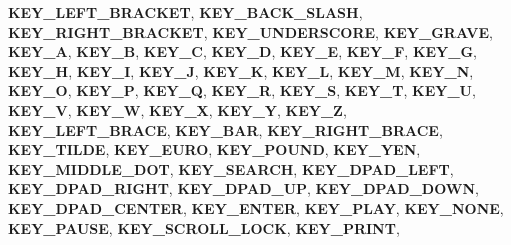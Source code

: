 \begin{DoxyCompactItemize}
{\bfseries K\+E\+Y\+\_\+\+L\+E\+F\+T\+\_\+\+B\+R\+A\+C\+K\+ET}, 
\newline
{\bfseries K\+E\+Y\+\_\+\+B\+A\+C\+K\+\_\+\+S\+L\+A\+SH}, 
{\bfseries K\+E\+Y\+\_\+\+R\+I\+G\+H\+T\+\_\+\+B\+R\+A\+C\+K\+ET}, 
{\bfseries K\+E\+Y\+\_\+\+U\+N\+D\+E\+R\+S\+C\+O\+RE}, 
{\bfseries K\+E\+Y\+\_\+\+G\+R\+A\+VE}, 
\newline
{\bfseries K\+E\+Y\+\_\+A}, 
{\bfseries K\+E\+Y\+\_\+B}, 
{\bfseries K\+E\+Y\+\_\+C}, 
{\bfseries K\+E\+Y\+\_\+D}, 
\newline
{\bfseries K\+E\+Y\+\_\+E}, 
{\bfseries K\+E\+Y\+\_\+F}, 
{\bfseries K\+E\+Y\+\_\+G}, 
{\bfseries K\+E\+Y\+\_\+H}, 
\newline
{\bfseries K\+E\+Y\+\_\+I}, 
{\bfseries K\+E\+Y\+\_\+J}, 
{\bfseries K\+E\+Y\+\_\+K}, 
{\bfseries K\+E\+Y\+\_\+L}, 
\newline
{\bfseries K\+E\+Y\+\_\+M}, 
{\bfseries K\+E\+Y\+\_\+N}, 
{\bfseries K\+E\+Y\+\_\+O}, 
{\bfseries K\+E\+Y\+\_\+P}, 
\newline
{\bfseries K\+E\+Y\+\_\+Q}, 
{\bfseries K\+E\+Y\+\_\+R}, 
{\bfseries K\+E\+Y\+\_\+S}, 
{\bfseries K\+E\+Y\+\_\+T}, 
\newline
{\bfseries K\+E\+Y\+\_\+U}, 
{\bfseries K\+E\+Y\+\_\+V}, 
{\bfseries K\+E\+Y\+\_\+W}, 
{\bfseries K\+E\+Y\+\_\+X}, 
\newline
{\bfseries K\+E\+Y\+\_\+Y}, 
{\bfseries K\+E\+Y\+\_\+Z}, 
{\bfseries K\+E\+Y\+\_\+\+L\+E\+F\+T\+\_\+\+B\+R\+A\+CE}, 
{\bfseries K\+E\+Y\+\_\+\+B\+AR}, 
\newline
{\bfseries K\+E\+Y\+\_\+\+R\+I\+G\+H\+T\+\_\+\+B\+R\+A\+CE}, 
{\bfseries K\+E\+Y\+\_\+\+T\+I\+L\+DE}, 
{\bfseries K\+E\+Y\+\_\+\+E\+U\+RO}, 
{\bfseries K\+E\+Y\+\_\+\+P\+O\+U\+ND}, 
\newline
{\bfseries K\+E\+Y\+\_\+\+Y\+EN}, 
{\bfseries K\+E\+Y\+\_\+\+M\+I\+D\+D\+L\+E\+\_\+\+D\+OT}, 
{\bfseries K\+E\+Y\+\_\+\+S\+E\+A\+R\+CH}, 
{\bfseries K\+E\+Y\+\_\+\+D\+P\+A\+D\+\_\+\+L\+E\+FT}, 
\newline
{\bfseries K\+E\+Y\+\_\+\+D\+P\+A\+D\+\_\+\+R\+I\+G\+HT}, 
{\bfseries K\+E\+Y\+\_\+\+D\+P\+A\+D\+\_\+\+UP}, 
{\bfseries K\+E\+Y\+\_\+\+D\+P\+A\+D\+\_\+\+D\+O\+WN}, 
{\bfseries K\+E\+Y\+\_\+\+D\+P\+A\+D\+\_\+\+C\+E\+N\+T\+ER}, 
\newline
{\bfseries K\+E\+Y\+\_\+\+E\+N\+T\+ER}, 
{\bfseries K\+E\+Y\+\_\+\+P\+L\+AY}, 
{\bfseries K\+E\+Y\+\_\+\+N\+O\+NE}, 
{\bfseries K\+E\+Y\+\_\+\+P\+A\+U\+SE}, 
\newline
{\bfseries K\+E\+Y\+\_\+\+S\+C\+R\+O\+L\+L\+\_\+\+L\+O\+CK}, 
{\bfseries K\+E\+Y\+\_\+\+P\+R\+I\+NT}, 

\end{DoxyCompactItemize}
